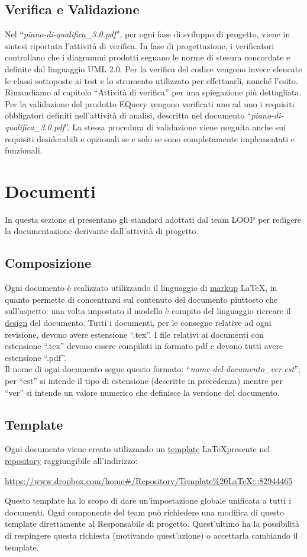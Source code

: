 \documentclass[a4paper,11pt]{article}
\begin{document}
\subsection{Verifica e Validazione}
Nel ``\textit{piano-di-qualifica\_3.0.pdf}'', per ogni fase di sviluppo di progetto, viene in sintesi riportata l'attivit\`a di verifica. In fase di progettazione, i verificatori controllano che i diagrammi prodotti seguano le norme di stesura concordate e definite dal linguaggio UML 2.0. Per la verifica del codice vengono invece elencate le classi sottoposte ai test e lo strumento utilizzato per effettuarli, nonch\'e l'esito. Rimandiamo al capitolo ``Attivit\`a di verifica'' per una spiegazione pi\`u dettagliata.
\\
Per la validazione del prodotto EQuery vengono verificati uno ad uno i requisiti obbligatori definiti nell'attivit\`a di analisi, descritta nel documento ``\textit{piano-di-qualifica\_3.0.pdf}''.
La stessa procedura di validazione viene eseguita anche sui requisiti desiderabili e opzionali se e solo se sono completamente implementati e funzionali.
\newpage
\section{Documenti}
In questa sezione si presentano gli standard adottati dal team LOOP per redigere la documentazione derivante dall'attivit\`a di progetto.
\subsection{Composizione}
Ogni documento \`e realizzato utilizzando il linguaggio di \underline{markup} \LaTeX , in quanto permette di concentrarsi sul contenuto del documento piuttosto che sull'aspetto: una volta impostato il modello \`e compito del linguaggio ricreare il \underline{design} del documento. Tutti i documenti, per le consegne relative ad ogni revisione, devono avere estensione ``.tex''. I file relativi ai documenti con estensione ``.tex'' devono essere compilati in formato pdf e devono tutti avere estensione ``.pdf''.\\
Il nome di ogni documento segue questo formato: ``\textit{nome-del-documento\_ver.est}''; per ``est'' si intende il tipo di estensione (descritte in precedenza) mentre per ``ver'' si intende un valore numerico che definisce la versione del documento. 
\subsection{Template}
Ogni documento viene creato utilizzando un \underline{template} \LaTeX  presente nel \underline{repository} raggiungibile all'indirizzo:
\begin{center}
\url{https://www.dropbox.com/home#/Repository/Template%20LaTeX:::82944465}
\end{center}
Questo template ha lo scopo di dare un'impostazione globale unificata a tutti i documenti. Ogni componente del team pu\`o richiedere una modifica di questo template direttamente al Responsabile di progetto. Quest'ultimo ha la possibilit\`a di respingere questa richiesta (motivando quest'azione) o accettarla cambiando il template.
\end{document}
